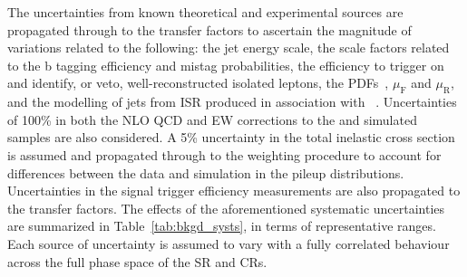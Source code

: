 The uncertainties from known theoretical and experimental sources are
propagated through to the transfer factors to ascertain the magnitude
of variations related to the following: the jet energy scale, the
scale factors related to the b tagging efficiency and mistag
probabilities, the efficiency to trigger on and identify, or veto,
well-reconstructed isolated leptons, the
PDFs~\cite{Butterworth:2015oua}, $\mu_\mathrm{F}$ and $\mu_\mathrm{R}$,
and the modelling of jets from ISR produced in association with
\ttbar~\cite{Chatrchyan:2013xna}. Uncertainties of 100\% in both the
NLO QCD and EW corrections to the \wj and \zj simulated samples are
also considered. A 5\% uncertainty in the total inelastic cross
section~\cite{Aaboud:2016mmw} is assumed and propagated through to the
weighting procedure to account for differences between the data and
simulation in the pileup distributions. Uncertainties in the signal
trigger efficiency measurements are also propagated to the transfer
factors. The effects of the aforementioned systematic uncertainties
are summarized in Table~\ref{tab:bkgd_systs}, in terms of
representative ranges.  Each source of uncertainty is assumed to vary
with a fully correlated behaviour across the full phase space of the
SR and CRs.

